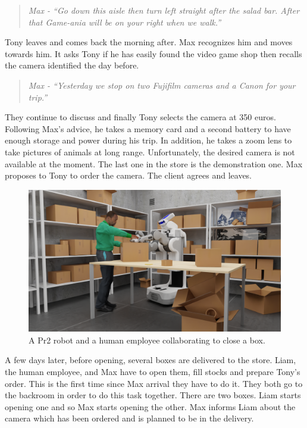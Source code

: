 \begin{quote} 
\centering 
\textit{
Max - ``Go down this aisle then turn left straight after the salad bar. After that Game-ania will be on your right when we walk.''}
\end{quote}

Tony leaves and comes back the morning after. Max recognizes him and moves towards him. It asks Tony if he has easily found the video game shop then recalls the camera identified the day before.

\begin{quote} 
\centering 
\textit{
Max - ``Yesterday we stop on two Fujifilm cameras and a Canon for your trip.''}
\end{quote}

They continue to discuss and finally Tony selects the camera at 350 euros. Following Max's advice, he takes a memory card and a second battery to have enough storage and power during his trip. In addition, he takes a zoom lens to take pictures of animals at long range. Unfortunately, the desired camera is not available at the moment. The last one in the store is the demonstration one. Max proposes to Tony to order the camera. The client agrees and leaves.

\begin{figure}[ht!]
\centering
\includegraphics[width=\textwidth]{figures/introduction/camera_store_5.png}
\caption{\label{fig:cam_back} A Pr2 robot and a human employee collaborating to close a box. }
\end{figure}

A few days later, before opening, several boxes are delivered to the store. Liam, the human employee, and Max have to open them, fill stocks and prepare Tony's order. This is the first time since Max arrival they have to do it. They both go to the backroom in order to do this task together. There are two boxes. Liam starts opening one and so Max starts opening the other. Max informs Liam about the camera which has been ordered and is planned to be in the delivery.

